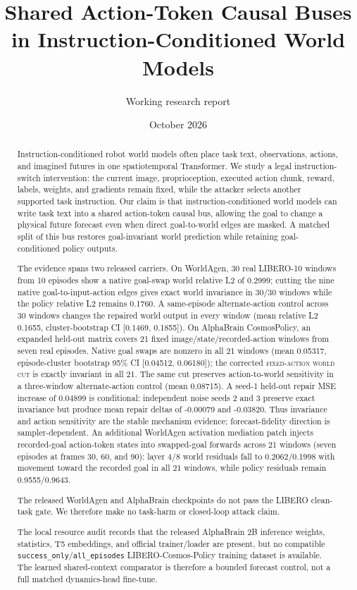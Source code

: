 \documentclass[10pt]{article}
\title{Shared Action-Token Causal Buses in Instruction-Conditioned World Models}
\author{Working research report}
\date{October 2026}
\newcommand{\cut}{\textsc{fixed-action world cut}}
\begin{document}
\maketitle

\begin{abstract}
Instruction-conditioned robot world models often place task text, observations, actions, and imagined futures in one spatiotemporal Transformer. We study a legal instruction-switch intervention: the current image, proprioception, executed action chunk, reward, labels, weights, and gradients remain fixed, while the attacker selects another supported task instruction. Our claim is that instruction-conditioned world models can write task text into a shared action-token causal bus, allowing the goal to change a physical future forecast even when direct goal-to-world edges are masked. A matched split of this bus restores goal-invariant world prediction while retaining goal-conditioned policy outputs.

The evidence spans two released carriers. On WorldAgen, 30 real LIBERO-10 windows from 10 episodes show a native goal-swap world relative L2 of 0.2999; cutting the nine native goal-to-input-action edges gives exact world invariance in 30/30 windows while the policy relative L2 remains 0.1760. A same-episode alternate-action control across 30 windows changes the repaired world output in every window (mean relative L2 0.1655, cluster-bootstrap CI [0.1469, 0.1855]). On AlphaBrain CosmosPolicy, an expanded held-out matrix covers 21 fixed image/state/recorded-action windows from seven real episodes. Native goal swaps are nonzero in all 21 windows (mean 0.05317, episode-cluster bootstrap 95\% CI [0.04512, 0.06180]); the corrected \cut{} is exactly invariant in all 21. The same cut preserves action-to-world sensitivity in a three-window alternate-action control (mean 0.08715). A seed-1 held-out repair MSE increase of 0.04899 is conditional: independent noise seeds 2 and 3 preserve exact invariance but produce mean repair deltas of -0.00079 and -0.03820. Thus invariance and action sensitivity are the stable mechanism evidence; forecast-fidelity direction is sampler-dependent.
An additional WorldAgen activation mediation patch injects recorded-goal action-token states into swapped-goal forwards across 21 windows (seven episodes at frames 30, 60, and 90): layer 4/8 world residuals fall to 0.2062/0.1998 with movement toward the recorded goal in all 21 windows, while policy residuals remain 0.9555/0.9643.

The released WorldAgen and AlphaBrain checkpoints do not pass the LIBERO clean-task gate. We therefore make no task-harm or closed-loop attack claim.

The local resource audit records that the released AlphaBrain 2B inference weights, statistics, T5 embeddings, and official trainer/loader are present, but no compatible \texttt{success\_only}/\texttt{all\_episodes} LIBERO-Cosmos-Policy training dataset is available. The learned shared-context comparator is therefore a bounded forecast control, not a full matched dynamics-head fine-tune.
\end{abstract}
\end{document}
